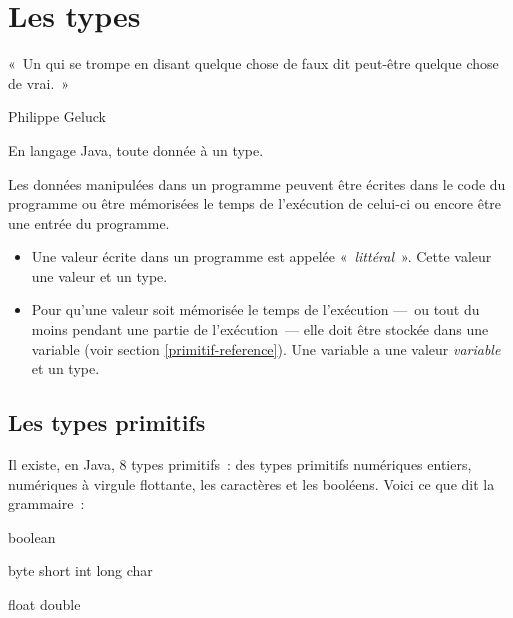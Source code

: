 \chapter{Les types}
\label{chap:types}

\begin{Exergue}

	«~Un  qui se trompe en disant quelque chose de faux dit peut-être
	quelque chose de vrai.~»

	\begin{flushright}

		Philippe Geluck
		
	\end{flushright}

\end{Exergue}

En langage Java, toute donnée à un type. 

Les données manipulées dans un programme peuvent être écrites dans le code du
programme ou être mémorisées le temps de l'exécution de celui-ci ou encore être
une entrée du programme. 


\begin{itemize}
	\item Une valeur écrite dans un programme est appelée
		«~\textit{littéral}~». Cette valeur une valeur et un type. 

	\item Pour qu'une valeur soit mémorisée le temps de l'exécution —~ou tout
		du moins pendant une partie de l'exécution~— elle doit être stockée
		dans une variable (voir section \vref{primitif-reference}). Une
		variable a une valeur \textit{variable} et un type. 

\end{itemize}

\minitoc

\section{Les types primitifs}

Il existe, en Java, 8 types primitifs~: des types primitifs numériques
entiers, numériques à virgule flottante, les  caractères et les booléens.
Voici ce que dit la grammaire~: 

\begin{grammaire}
		boolean


		byte short int long char

		float double
\end{grammaire}

